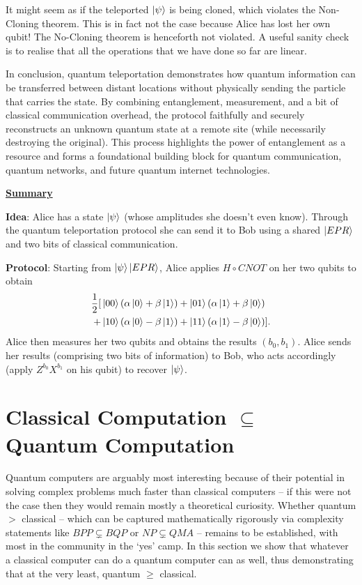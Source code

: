 \begin{remark}
    It might seem as if the teleported \(\ket{\psi}\) is being cloned, which violates the Non-Cloning theorem. This is in fact not the case because Alice has lost her own qubit! The No-Cloning theorem is henceforth not violated. A useful sanity check is to realise that all the operations that we have done so far are linear.
\end{remark}

In conclusion, quantum teleportation demonstrates how quantum information can be transferred between distant locations without physically sending the particle that carries the state. By combining entanglement, measurement, and a bit of classical communication overhead, the protocol faithfully and securely reconstructs an unknown quantum state at a remote site (while necessarily destroying the original). This process highlights the power of entanglement as a resource and forms a foundational building block for quantum communication, quantum networks, and future quantum internet technologies.

\textbf{\underline{Summary}}

\textbf{Idea}: Alice has a state $\ket{\psi}$ (whose amplitudes she doesn't even know). Through the quantum teleportation protocol she can send it to Bob using a shared $\ket{EPR}$ and two bits of classical communication.

\textbf{Protocol}: Starting from $\ket{\psi}\ket{EPR}$, Alice applies $H\circ CNOT$ on her two qubits to obtain
\begin{align*}
    \frac{1}{2}[&\ket{00}(\alpha\ket{0}+\beta\ket{1}) + \ket{01}(\alpha\ket{1}+\beta\ket{0})\\
    + &\ket{10}(\alpha\ket{0}-\beta\ket{1}) + \ket{11}(\alpha\ket{1}-\beta\ket{0})].
\end{align*}
Alice then measures her two qubits and obtains the results $(b_0,b_1)$. Alice sends her results (comprising two bits of information) to Bob, who acts accordingly (apply $Z^{b_0}X^{b_1}$ on his qubit) to recover $\ket{\psi}$.


\section[\texorpdfstring{Classical Computation $\bm{\subseteq}$ Quantum Computation}{}]{Classical Computation $\bm{\subseteq}$ Quantum Computation} 

Quantum computers are arguably most interesting because of their potential in solving complex problems much faster than classical computers -- if this were not the case then they would remain mostly a theoretical curiosity. Whether quantum $>$ classical -- which can be captured mathematically rigorously via complexity statements like $BPP \subsetneq BQP$ or $NP \subsetneq QMA$ -- remains to be established, with most in the community in the `yes' camp. In this section we show that whatever a classical computer can do a quantum computer can as well, thus demonstrating that at the very least, quantum $\geq$ classical.

